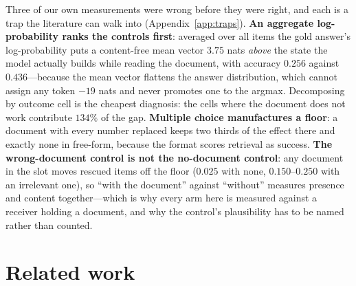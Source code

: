\documentclass{article}
\begin{document}
Three of our own measurements were wrong before they were right, and each is a
trap the literature can walk into (Appendix~\ref{app:traps}).
\textbf{An aggregate log-probability ranks the controls first}: averaged over
all items the gold answer's log-probability puts a content-free mean vector
$3.75$ nats \emph{above} the state the model actually builds while reading the
document, with accuracy $0.256$ against $0.436$---because the mean vector
flattens the answer distribution, which cannot assign any token $-19$ nats and
never promotes one to the argmax. Decomposing by outcome cell is the cheapest
diagnosis: the cells where the document does not work contribute $134\%$ of the
gap. \textbf{Multiple choice manufactures a floor}: a document with every number
replaced keeps two thirds of the effect there and exactly none in free-form,
because the format scores retrieval as success. \textbf{The wrong-document
control is not the no-document control}: any document in the slot moves rescued
items off the floor ($0.025$ with none, $0.150$--$0.250$ with an irrelevant
one), so ``with the document'' against ``without'' measures presence and content
together---which is why every arm here is measured against a receiver holding a
document, and why the control's plausibility has to be named rather than
counted.

\section{Related work}
\end{document}
